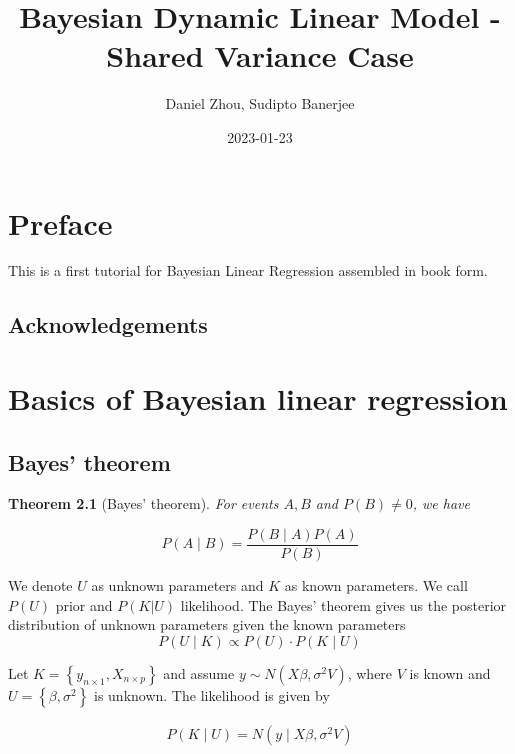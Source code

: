 \documentclass[
]{book}
\title{Bayesian Dynamic Linear Model - Shared Variance Case}
\author{Daniel Zhou, Sudipto Banerjee}
\date{2023-01-23}
\newtheorem{theorem}{Theorem}[chapter]
\theoremstyle{definition}
\theoremstyle{definition}
\theoremstyle{definition}
\theoremstyle{definition}
\theoremstyle{remark}
\begin{document}
\maketitle

{
\setcounter{tocdepth}{1}
\tableofcontents
}
\hypertarget{preface}{%
\chapter{Preface}\label{preface}}

This is a first tutorial for Bayesian Linear Regression assembled in book form.

\hypertarget{acknowledgements}{%
\section{Acknowledgements}\label{acknowledgements}}

\hypertarget{basics-of-bayesian-linear-regression}{%
\chapter{Basics of Bayesian linear regression}\label{basics-of-bayesian-linear-regression}}

\hypertarget{bayes-theorem}{%
\section{Bayes' theorem}\label{bayes-theorem}}

\begin{theorem}[Bayes' theorem]
\protect\hypertarget{thm:bayes}{}\label{thm:bayes}For events \(A, B\) and \(P(B) \neq 0\), we have

\[P(A\mid B) = \frac{P(B \mid A) P(A)}{P(B)}\]
\end{theorem}

We denote \(U\) as unknown parameters and \(K\) as known parameters. We call \(P(U)\) prior and \(P(K|U)\) likelihood. The Bayes' theorem gives us the posterior distribution of unknown parameters given the known parameters
\[ P(U \mid K) \propto P(U) \cdot P(K \mid U)\]

Let \(K = \left\{y_{n \times 1}, X_{n \times p} \right\}\) and assume \(y \sim N\left( X \beta, \sigma^{2} V\right)\), where \(V\) is known and \(U = \left\{\beta, \sigma^{2}\right\}\) is unknown. The likelihood is given by

\begin{align}
P(K \mid U)=N\left(y \mid X \beta, \sigma^{2} V\right)
\end{align}
\end{document}
